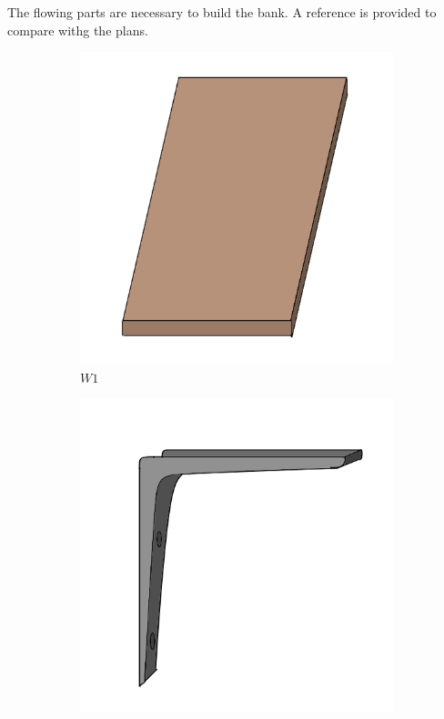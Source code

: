 \documentclass{subfiles}
\begin{document}
    The flowing parts are necessary to build the bank. A reference is provided to compare withg the plans.
    \begin{figure}[ht]
        \centering
        \begin{subfigure}[b]{0.3\textwidth}
            \centering
            \includegraphics[width=\textwidth]{Ressources/Piece_W1.png}
            \caption{$W1$}
            \label{fig:W1}
        \end{subfigure}
        \hfill
        \begin{subfigure}[b]{0.3\textwidth}
            \centering
            \includegraphics[width=\textwidth]{Ressources/Piece_M1.png}

\end{subfigure}
\end{figure}
\end{document}
